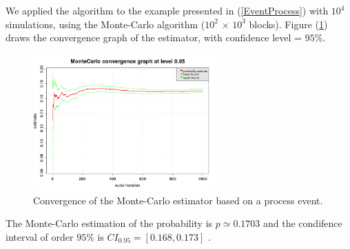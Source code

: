 We applied the algorithm to the example presented in (\ref{EventProcess}) with  $10^4$ simulations, using the Monte-Carlo algorithm ($10^2$ $\times$ $10^3$ blocks).
Figure (\ref{mc_eventprocess_convergency}) draws the convergence graph of the estimator, with confidence level = $95\%$.
\begin{figure}[H]
    \begin{center}
      \includegraphics[width=7cm]{MonteCarloEventProcessConvergency.png}
      \caption{Convergence of the Monte-Carlo estimator based on a process event.}
      \label{mc_eventprocess_convergency}
    \end{center}
\end{figure}

The Monte-Carlo estimation of the probability is $p \simeq 0.1703$ and the condifence interval of order $95\%$ is $CI_{0.95}= [0.168, 0.173]$ .


